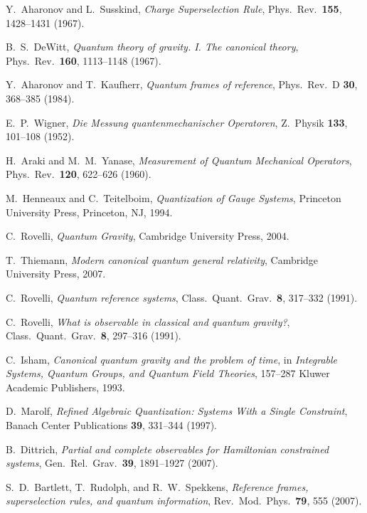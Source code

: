 \documentclass[aps,10pt,twocolumn,showpacs,pra,citeautoscript,amsmath,amssymb,floatfix,superscriptaddress]{revtex4-1}
\begin{document}
\begin{thebibliography}{47}

Y.\ Aharonov and L.\ Susskind, \emph{Charge Superselection Rule}, Phys.\ Rev.\ \textbf{155}, 1428--1431 (1967).

B.\ S.\ DeWitt, \emph{Quantum theory of gravity. I. The canonical theory}, Phys.\ Rev.\ \textbf{160}, 1113--1148 (1967).

Y.\ Aharonov and T.\ Kaufherr, \emph{Quantum frames of reference}, Phys.\ Rev.\ D \textbf{30}, 368--385 (1984).

E.\ P.\ Wigner, \emph{Die Messung quantenmechanischer Operatoren}, Z.\ Physik \textbf{133}, 101--108 (1952).

H.\ Araki and M.\ M.\ Yanase, \emph{Measurement of Quantum Mechanical Operators}, Phys.\ Rev.\ \textbf{120}, 622--626 (1960).

M.\ Henneaux and C.\ Teitelboim, \emph{Quantization of Gauge Systems}, Princeton University Press, Princeton, NJ, 1994.

C.\ Rovelli, \emph{Quantum Gravity}, Cambridge University Press, 2004.

T.\ Thiemann, \emph{Modern canonical quantum general relativity}, Cambridge University Press, 2007.

C.\ Rovelli, \emph{Quantum reference systems}, Class.\ Quant.\ Grav.\ \textbf{8}, 317--332 (1991).

C.\ Rovelli, \emph{What is observable in classical and quantum gravity?}, Class.\ Quant.\ Grav.\ \textbf{8}, 297--316 (1991).

C.\ Isham, \emph{Canonical quantum gravity and the problem of time}, in \emph{Integrable Systems, Quantum Groups, and Quantum Field Theories}, 157--287 Kluwer Academic Publishers, 1993.

D.\ Marolf, \emph{Refined Algebraic Quantization: Systems With a Single Constraint}, Banach Center Publications \textbf{39}, 331--344 (1997).

B.\ Dittrich, \emph{Partial and complete observables for Hamiltonian constrained systems}, Gen.\ Rel.\ Grav.\ \textbf{39}, 1891--1927 (2007).

S.\ D.\ Bartlett, T.\ Rudolph, and R.\ W.\ Spekkens, \emph{Reference frames, superselection rules, and quantum information}, Rev.\ Mod.\ Phys.\ \textbf{79}, 555 (2007).


\end{thebibliography}
\end{document}
